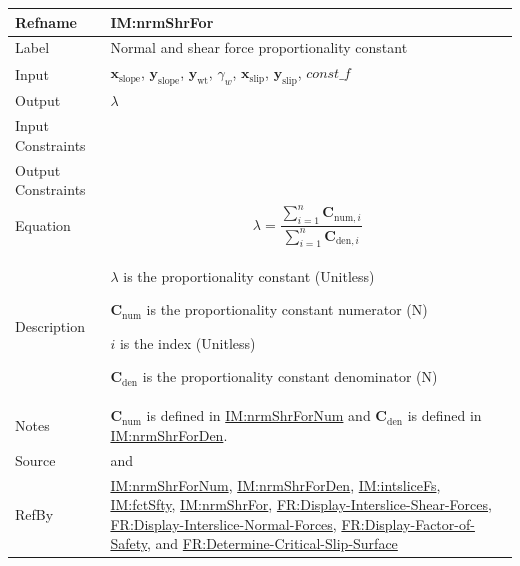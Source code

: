 \documentclass[12pt]{article}
\begin{document}
\medskip
\noindent
\begin{minipage}{\textwidth}
\begin{tabular}{>{\raggedright}p{}>{\raggedright\arraybackslash}p{}}
\toprule \textbf{Refname} & \textbf{IM:nrmShrFor}
\label{IM:nrmShrFor}
\\ \midrule
Label & Normal and shear force proportionality constant
        
\\ \midrule
Input & ${\symbf{x}_{\text{slope}}}$, ${\symbf{y}_{\text{slope}}}$, ${\symbf{y}_{\text{wt}}}$, ${γ_{w}}$, ${\symbf{x}_{\text{slip}}}$, ${\symbf{y}_{\text{slip}}}$, $\mathit{const\_f}$
        
\\ \midrule
Output & $λ$
         
\\ \midrule
Input Constraints & 
\\ \midrule
Output Constraints & 
\\ \midrule
Equation & \begin{displaymath}
           λ=\frac{\displaystyle\sum_{i=1}^{n}{{\symbf{C}_{\text{num},i}}}}{\displaystyle\sum_{i=1}^{n}{{\symbf{C}_{\text{den},i}}}}
           \end{displaymath}
\\ \midrule
Description & \begin{symbDescription}
              \item{$λ$ is the proportionality constant (Unitless)}
              \item{${\symbf{C}_{\text{num}}}$ is the proportionality constant numerator (${\text{N}}$)}
              \item{$i$ is the index (Unitless)}
              \item{${\symbf{C}_{\text{den}}}$ is the proportionality constant denominator (${\text{N}}$)}
              \end{symbDescription}
\\ \midrule
Notes & ${\symbf{C}_{\text{num}}}$ is defined in \hyperref[IM:nrmShrForNum]{IM:nrmShrForNum} and ${\symbf{C}_{\text{den}}}$ is defined in \hyperref[IM:nrmShrForDen]{IM:nrmShrForDen}.
        
\\ \midrule
Source & \cite{chen2005} and \cite{karchewski2012}
         
\\ \midrule
RefBy & \hyperref[IM:nrmShrForNum]{IM:nrmShrForNum}, \hyperref[IM:nrmShrForDen]{IM:nrmShrForDen}, \hyperref[IM:intsliceFs]{IM:intsliceFs}, \hyperref[IM:fctSfty]{IM:fctSfty}, \hyperref[IM:nrmShrFor]{IM:nrmShrFor}, \hyperref[displayShear]{FR:Display-Interslice-Shear-Forces}, \hyperref[displayNormal]{FR:Display-Interslice-Normal-Forces}, \hyperref[displayFS]{FR:Display-Factor-of-Safety}, and \hyperref[determineCritSlip]{FR:Determine-Critical-Slip-Surface}
        
\\ \bottomrule
\end{tabular}
\end{minipage}
\end{document}
